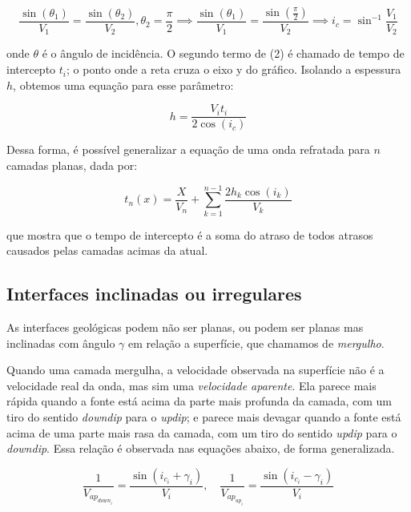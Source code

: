 \documentclass[a4paper,12pt]{article}
\begin{document}
\begin{equation}
    \frac{\sin(\theta_1)}{V_1} = \frac{\sin(\theta_2)}{V_2}, \theta_2 = \frac{\pi}{2} \implies \frac{\sin(\theta_1)}{V_1} = \frac{\sin(\frac{\pi}{2})}{V_2}  \implies i_c = \sin^{-1} \frac{V_1}{V_2}
\end{equation}

\noindent
onde $\theta$ é o ângulo de incidência. O segundo termo de (2) é chamado de tempo de intercepto $t_i$; o ponto onde a reta cruza o eixo y do gráfico. Isolando a espessura $h$, obtemos uma equação para esse parâmetro:


\begin{equation}
    h = \frac{V_i t_i}{2 \cos(i_c)}
\end{equation}


Dessa forma, é possível generalizar a equação de uma onda refratada para $n$ camadas planas, dada por:

\begin{equation}
    t_n(x) = \frac{X}{V_n} + \sum_{k=1}^{n-1} \frac{2h_k \cos(i_k)}{V_k}
\end{equation}

\noindent
que mostra que o tempo de intercepto é a soma do atraso de todos atrasos causados pelas camadas acimas da atual. 

\subsection{Interfaces inclinadas ou irregulares}

As interfaces geológicas podem não ser planas, ou podem ser planas mas inclinadas com ângulo $\gamma$ em relação a superfície, que chamamos de \textit{mergulho}. 

Quando uma camada mergulha, a velocidade observada na superfície não é a velocidade real da onda, mas sim uma \textit{velocidade aparente}. Ela parece mais rápida quando a fonte está  acima da parte mais profunda da camada, com um tiro do sentido \textit{downdip} para o \textit{updip}; e parece mais devagar quando a fonte está acima de uma parte mais rasa da camada, com um tiro do sentido \textit{updip} para o \textit{downdip}. Essa relação é observada nas equações abaixo, de forma generalizada.

\begin{equation}
    \frac{1}{V_{ap_{down_{i}}}} = \frac{\sin(i_{c_{i}} + \gamma_i)}{V_i}, \quad \frac{1}{V_{ap_{up_{i}}}} = \frac{\sin(i_{c_{i}} - \gamma_i)}{V_i}
\end{equation}
\end{document}
